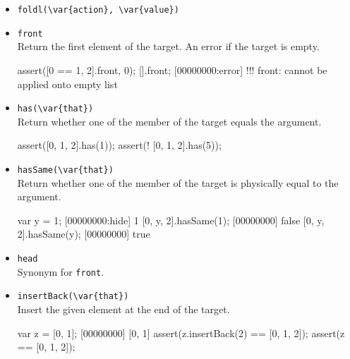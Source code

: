 \begin{itemize}
\item \lstinline|foldl(\var{action}, \var{value})|\\


\begin{urbiscript}[firstnumber=last]

\end{urbiscript}

\item \lstinline|front|\\
Return the first element of the target. An error if the target is
empty.

\begin{urbiscript}[firstnumber=last]
assert([0 == 1, 2].front, 0);
[].front;
[00000000:error] !!! front: cannot be applied onto empty list
\end{urbiscript}

\item \lstinline|has(\var{that})|\\
Return whether one of the member of the target equals the argument.

\begin{urbiscript}[firstnumber=last]
assert([0, 1, 2].has(1));
assert(! [0, 1, 2].has(5));
\end{urbiscript}

\item \lstinline|hasSame(\var{that})|\\

Return whether one of the member of the target is physically equal to
the argument.

\begin{urbiscript}[firstnumber=last]
var y = 1;
[00000000:hide] 1
[0, y, 2].hasSame(1);
[00000000] false
[0, y, 2].hasSame(y);
[00000000] true
\end{urbiscript}

\item \lstinline|head|\\
  Synonym for \lstinline|front|.

\item \lstinline|insertBack(\var{that})|\\
  Insert the given element at the end of the target.

\begin{urbiscript}[firstnumber=last]
var z = [0, 1];
[00000000] [0, 1]
assert(z.insertBack(2) == [0, 1, 2]);
assert(z == [0, 1, 2]);
\end{urbiscript}


\end{itemize}
